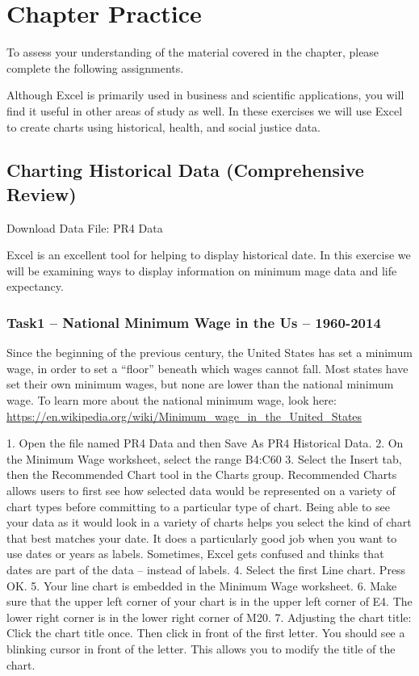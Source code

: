 \section{Chapter Practice}




To assess your understanding of the material covered in the chapter, please complete the following
assignments.

Although Excel is primarily used in business and scientific applications, you will find it useful in other
areas of study as well. In these exercises we will use Excel to create charts using historical, health, and
social justice data.

\subsection{Charting Historical Data (Comprehensive Review)}

Download Data File: PR4 Data

Excel is an excellent tool for helping to display historical date. In this exercise we will be examining
ways to display information on minimum mage data and life expectancy.



\subsubsection{Task1 – National Minimum Wage in the Us – 1960-2014}

Since the beginning of the previous century, the United States has set a minimum wage, in order to set
a “floor” beneath which wages cannot fall. Most states have set their own minimum wages, but none
are lower than the national minimum wage. To learn more about the national minimum wage, look
here: \url{https://en.wikipedia.org/wiki/Minimum_wage_in_the_United_States}

1. Open the file named PR4 Data and then Save As PR4 Historical Data.
2. On the Minimum Wage worksheet, select the range B4:C60
3. Select the Insert tab, then the Recommended Chart tool in the Charts group.
Recommended Charts allows users to first see how selected data would be represented on a
variety of chart types before committing to a particular type of chart. Being able to see your data
as it would look in a variety of charts helps you select the kind of chart that best matches your
date.
It does a particularly good job when you want to use dates or years as labels. Sometimes, Excel
gets confused and thinks that dates are part of the data – instead of labels.
4. Select the first Line chart. Press OK.
5. Your line chart is embedded in the Minimum Wage worksheet.
6. Make sure that the upper left corner of your chart is in the upper left corner of E4. The lower
right corner is in the lower right corner of M20.
7. Adjusting the chart title: Click the chart title once. Then click in front of the first letter. You
should see a blinking cursor in front of the letter. This allows you to modify the title of the chart.

